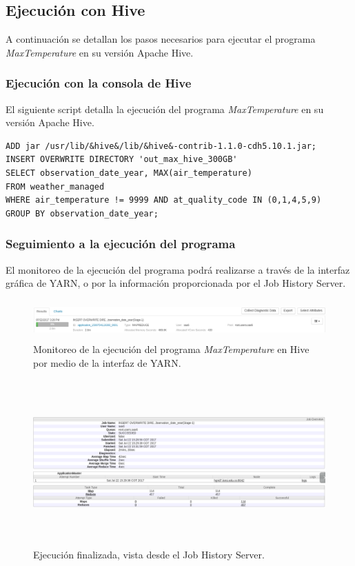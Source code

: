 \subsection{Ejecución con Hive}

A continuación se detallan los pasos necesarios para ejecutar el programa \textit{MaxTemperature} en su versión Apache Hive. \\

\subsubsection{Ejecución con la consola de Hive}

El siguiente script detalla la ejecución del programa \textit{MaxTemperature} en su versión Apache Hive.

\begin{lstlisting}[linewidth=\columnwidth,breaklines=true]
ADD jar /usr/lib/&hive&/lib/&hive&-contrib-1.1.0-cdh5.10.1.jar; 
INSERT OVERWRITE DIRECTORY 'out_max_hive_300GB' 
SELECT observation_date_year, MAX(air_temperature) 
FROM weather_managed 
WHERE air_temperature != 9999 AND at_quality_code IN (0,1,4,5,9) 
GROUP BY observation_date_year;
\end{lstlisting} 

\subsubsection{Seguimiento a la ejecución del programa}

El monitoreo de la ejecución del programa podrá realizarse a través de la interfaz gráfica de YARN, o por la información proporcionada por el Job History Server.

\begin{figure}[H]
  \centering
      \includegraphics[width=\textwidth, height=0.6in]{fig/04/06}
  \caption{Monitoreo de la ejecución del programa \textit{MaxTemperature} en Hive por medio de la interfaz de YARN. }
\end{figure}

\begin{figure}[H]
  \centering
      \includegraphics[width=\textwidth, height=2.5in]{fig/04/07}
  \caption{Ejecución finalizada, vista desde el Job History Server.}
\end{figure}



